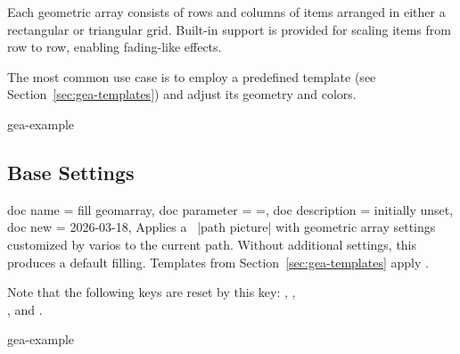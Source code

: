 \documentclass[a4paper,11pt]{article}
\begin{document}
Each geometric array consists of rows and columns of items arranged in either a
rectangular or triangular grid. Built-in support is provided for scaling items
from row to row, enabling fading-like effects.

The most common use case is to employ a predefined template (see
Section~\ref{sec:gea-templates}) and adjust its geometry and colors.


\begin{dispExample*}{gea-example}
\end{dispExample*}


\subsection{Base Settings}

\begin{docTikzKeys}
  {
    {
      doc name        = fill geomarray,
      doc parameter   = {=},
      doc description = {initially unset},
      doc new         = 2026-03-18,
    }
  }
  Applies a \tikzname\ |path picture| with geometric array settings
  customized by varios  to the current
  path. Without additional settings, this produces a default filling. Templates
  from Section~\ref{sec:gea-templates} apply .\par
  Note that the following keys are reset by this key:
  ,
  ,\\
  , and
  .

\begin{dispExample*}{gea-example}
\end{dispExample*}
\end{docTikzKeys}


\clearpage
\end{document}

